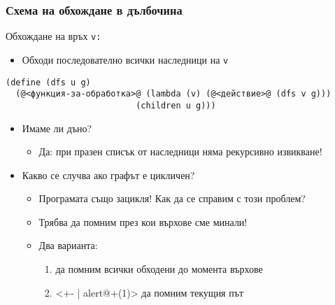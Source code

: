 \documentclass{beamer}
\begin{document}
\begin{frame}[fragile]
  \frametitle{Схема на обхождане в дълбочина}

  Обхождане на връх \tt v:
  \begin{itemize}
  \item Обходи последователно всички наследници на \tt v
  \end{itemize}
  \pause
{\small
\begin{lstlisting}
(define (dfs u g)
  (@<функция-за-обработка>@ (lambda (v) (@<действие>@ (dfs v g)))
                          (children u g)))
\end{lstlisting}
}
  \pause
  \begin{itemize}[<+->]
  \item \alert{Имаме ли дъно?}
    \begin{itemize}
    \item Да:  при празен списък от наследници няма рекурсивно извикване!
    \end{itemize}
  \item \alert{Какво се случва ако графът е цикличен?}
    \begin{itemize}
    \item Програмата също зацикля! Как да се справим с този проблем?
    \item Трябва да помним през кои върхове сме минали!
    \item Два варианта:
      \begin{enumerate}
      \item да помним всички обходени до момента върхове
      \item<+- | alert@+(1)> да помним текущия път
      \end{enumerate}
    \end{itemize}
  \end{itemize}
\end{frame}
\end{document}
